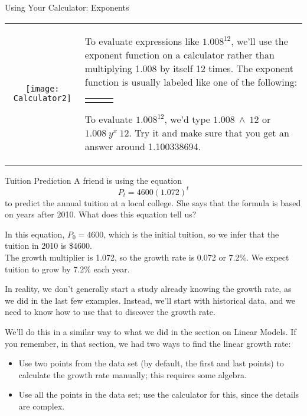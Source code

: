 \begin{proc}{Using Your Calculator: Exponents}
\begin{tabular}{c l}
\texttt{[image: Calculator2]} & \parbox[b]{3in}{To evaluate expressions like $1.008^{12}$, we'll use the exponent function on a calculator rather than multiplying 1.008 by itself 12 times.  The exponent function is usually labeled like one of the following:
\begin{center}
\begin{tabular}{c c c}
$\boxed{\wedge}$ & $\boxed{y^x}$ & $\boxed{x^y}$
\end{tabular}
\end{center}

To evaluate $1.008^{12}$, we'd type $1.008 \ \boxed{\wedge}\ 12$ or $1.008\ \boxed{y^x}\ 12$.  Try it and make sure that you get an answer around 1.100338694.}
\end{tabular}
\end{proc}
\pagebreak

\begin{example}[https://www.youtube.com/watch?v=_u9RlZX_BkI&list=PLfmpjsIzhztutjEb8Pg5OBOlI1p80yVoy&index=9]{Tuition Prediction}
A friend is using the equation \[P_t = 4600(1.072)^t\] to predict the annual tuition at a local college.  She says that the formula is based on years after 2010.  What does this equation tell us?

\sol
In this equation, $P_0 = 4600$, which is the initial tuition, so we infer that the tuition in 2010 is \$4600.\\

The growth multiplier is 1.072, so the growth rate is 0.072 or 7.2\%.  We expect tuition to grow by 7.2\% each year.
\end{example}

In reality, we don't generally start a study already knowing the growth rate, as we did in the last few examples.  Instead, we'll start with historical data, and we need to know how to use that to discover the growth rate.

We'll do this in a similar way to what we did in the section on Linear Models.  If you remember, in that section, we had two ways to find the linear growth rate:
\begin{itemize}
\item Use two points from the data set (by default, the first and last points) to calculate the growth rate manually; this requires some algebra.
\item Use all the points in the data set; use the calculator for this, since the details are complex.
\end{itemize}

